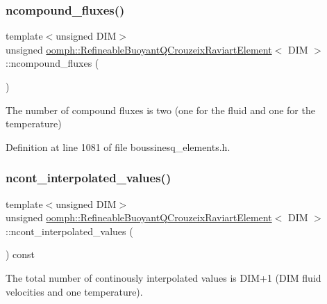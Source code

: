 \subsubsection{\texorpdfstring{ncompound\+\_\+fluxes()}{ncompound\_fluxes()}}
{\footnotesize\ttfamily template$<$unsigned D\+IM$>$ \\
unsigned \hyperlink{classoomph_1_1RefineableBuoyantQCrouzeixRaviartElement}{oomph\+::\+Refineable\+Buoyant\+Q\+Crouzeix\+Raviart\+Element}$<$ D\+IM $>$\+::ncompound\+\_\+fluxes (\begin{DoxyParamCaption}{ }\end{DoxyParamCaption})\hspace{0.3cm}{\ttfamily [inline]}}



The number of compound fluxes is two (one for the fluid and one for the temperature) 



Definition at line 1081 of file boussinesq\+\_\+elements.\+h.

\mbox{\label{classoomph_1_1RefineableBuoyantQCrouzeixRaviartElement_a98f094a1c3080905d0e90f5ac6ebd1b6}} 
\subsubsection{\texorpdfstring{ncont\+\_\+interpolated\+\_\+values()}{ncont\_interpolated\_values()}}
{\footnotesize\ttfamily template$<$unsigned D\+IM$>$ \\
unsigned \hyperlink{classoomph_1_1RefineableBuoyantQCrouzeixRaviartElement}{oomph\+::\+Refineable\+Buoyant\+Q\+Crouzeix\+Raviart\+Element}$<$ D\+IM $>$\+::ncont\+\_\+interpolated\+\_\+values (\begin{DoxyParamCaption}{ }\end{DoxyParamCaption}) const\hspace{0.3cm}{\ttfamily [inline]}}



The total number of continously interpolated values is D\+I\+M+1 (D\+IM fluid velocities and one temperature). 



